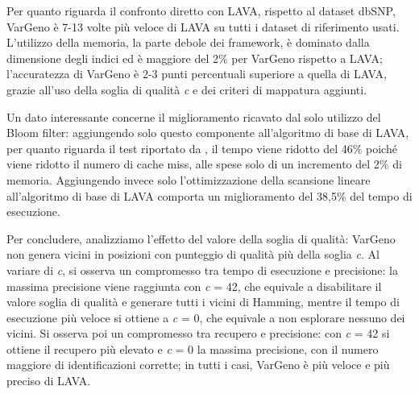 \documentclass[../main.tex]{subfiles}
\begin{document}
\noindent
Per quanto riguarda il confronto diretto con LAVA, rispetto al dataset dbSNP, VarGeno è 7-13 volte più veloce di LAVA su tutti i dataset di riferimento usati. L'utilizzo della memoria, la parte debole dei framework, è dominato dalla dimensione degli indici ed è maggiore del 2\% per VarGeno rispetto a LAVA; l'accuratezza di VarGeno è 2-3 punti percentuali superiore a quella di LAVA, grazie all'uso della soglia di qualità \textit{c} e dei criteri di mappatura aggiunti. 

Un dato interessante concerne il miglioramento ricavato dal solo utilizzo del Bloom filter: aggiungendo solo questo componente all'algoritmo di base di LAVA, per quanto riguarda il test riportato da \cite{sun-medvedev2018vargeno}, il tempo viene ridotto del 46\% poiché viene ridotto il numero di cache miss, alle spese solo di un incremento del 2\% di memoria. Aggiungendo invece solo l'ottimizzazione della scansione lineare all'algoritmo di base di LAVA comporta un miglioramento del 38,5\% del tempo di esecuzione. 

Per concludere, analizziamo l'effetto del valore della soglia di qualità: VarGeno non genera vicini in posizioni con punteggio di qualità più della soglia \textit{c}. Al variare di \textit{c}, si osserva un compromesso tra tempo di esecuzione e precisione: la massima precisione viene raggiunta con \textit{c} = 42, che equivale a disabilitare il valore soglia di qualità e generare tutti i vicini di Hamming, mentre il tempo di esecuzione più veloce si ottiene a \textit{c} = 0, che equivale a non esplorare nessuno dei vicini. Si osserva poi un compromesso tra recupero e precisione: con \textit{c} = 42 si ottiene il recupero più elevato e \textit{c} = 0 la massima precisione, con il numero maggiore di identificazioni corrette; in tutti i casi, VarGeno è più veloce e più preciso di LAVA. 
\end{document}

